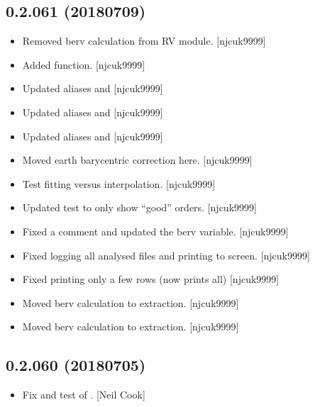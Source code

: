 \documentclass[a4paper,10pt,english]{report}
\begin{document}
\subsection{0.2.061 (2018\sphinxhyphen{}07\sphinxhyphen{}09)}
\label{\detokenize{misc/changelog:id418}}\begin{itemize}
\item {} 
Removed berv calculation from RV module. {[}njcuk9999{]}

\item {} 
Added  function. {[}njcuk9999{]}

\item {} 
Updated aliases and  {[}njcuk9999{]}

\item {} 
Updated aliases and  {[}njcuk9999{]}

\item {} 
Updated aliases and  {[}njcuk9999{]}

\item {} 
Moved earth barycentric correction here. {[}njcuk9999{]}

\item {} 
Test fitting versus interpolation. {[}njcuk9999{]}

\item {} 
Updated test to only show “good” orders. {[}njcuk9999{]}

\item {} 
Fixed a comment and updated the berv variable. {[}njcuk9999{]}

\item {} 
Fixed logging all analysed files and printing to screen. {[}njcuk9999{]}

\item {} 
Fixed  printing only a few rows (now prints all)
{[}njcuk9999{]}

\item {} 
Moved berv calculation to extraction. {[}njcuk9999{]}

\item {} 
Moved berv calculation to extraction. {[}njcuk9999{]}

\end{itemize}


\subsection{0.2.060 (2018\sphinxhyphen{}07\sphinxhyphen{}05)}
\label{\detokenize{misc/changelog:id419}}\begin{itemize}
\item {} 
Fix and test of . {[}Neil Cook{]}

\end{itemize}
\end{document}
